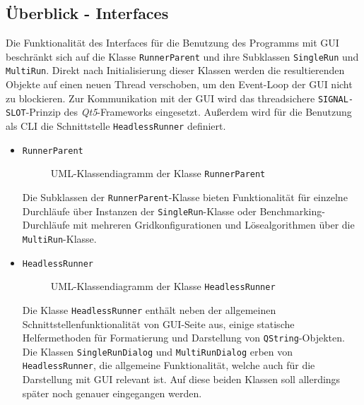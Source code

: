 \subsection{Überblick - Interfaces}
\label{subsec:aufbau_frontend_ueberblick_interfaces}
Die Funktionalität des Interfaces für die Benutzung des Programms mit \ac{GUI} beschränkt sich auf die Klasse \texttt{RunnerParent}
und ihre Subklassen \texttt{SingleRun} und \texttt{MultiRun}.
Direkt nach Initialisierung dieser Klassen werden die resultierenden Objekte auf einen neuen Thread verschoben, um den Event-Loop der \ac{GUI} nicht zu blockieren.
Zur Kommunikation mit der \ac{GUI} wird das threadsichere \texttt{SIGNAL-SLOT}-Prinzip \cite{Qt52024} des \textit{Qt5}-Frameworks eingesetzt.
Außerdem wird für die Benutzung als \ac{CLI} die Schnittstelle \texttt{HeadlessRunner} definiert.
\begin{itemize}
    \item \texttt{RunnerParent}\\
    \begin{figure}[H]
        \vspace{-0.5cm}
        \centering
        
        \caption{UML-Klassendiagramm der Klasse \texttt{RunnerParent}}
        \label{fig:uml_runner_parent}
    \end{figure}
    Die Subklassen der \texttt{RunnerParent}-Klasse bieten Funktionalität für einzelne Durchläufe über Instanzen der \texttt{SingleRun}-Klasse
    oder Benchmarking-Durchläufe mit mehreren Gridkonfigurationen und Lösealgorithmen über die \texttt{MultiRun}-Klasse.
    \item \texttt{HeadlessRunner}\\
    \begin{figure}[H]
        \vspace{-0.5cm}
        \centering
        
        \caption{UML-Klassendiagramm der Klasse \texttt{HeadlessRunner}}
        \label{fig:uml_headlessRunner}
    \end{figure}
    Die Klasse \texttt{HeadlessRunner} enthält neben der allgemeinen Schnittstellenfunktionalität von \ac{GUI}-Seite aus,
    einige statische Helfermethoden für Formatierung und Darstellung von \texttt{QString}-Objekten.
    Die Klassen \texttt{SingleRunDialog} und \texttt{MultiRunDialog} erben von \texttt{HeadlessRunner}, die allgemeine Funktionalität,
    welche auch für die Darstellung mit \ac{GUI} relevant ist.
    Auf diese beiden Klassen soll allerdings später noch genauer eingegangen werden.
\end{itemize}
